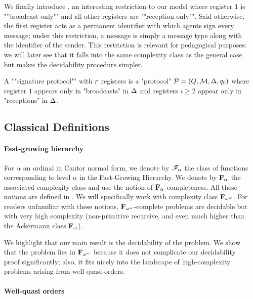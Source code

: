 \AP We finally introduce , an interesting restriction to our model where register $1$ is ""broadcast-only"" and all other registers are ""reception-only"". Said otherwise, the first register acts as a permanent identifier with which agents sign every message; under this restriction, a message is simply a message type along with the identifier of the sender. This restriction is relevant for pedagogical purposes: we will later see that it falls into the same complexity class as the general case but makes the decidability procedure simpler. 

\begin{definition}
A ""signature protocol"" with $r$ registers is a "protocol" $\mathcal{P} = (Q, \mathcal{M}, \Delta, q_0)$ where register $1$ appears only in "broadcasts" in $\Delta$ and registers $i \geq 2$ appear only in "receptions" in $\Delta$. 
\end{definition}

\subsection{Classical Definitions}


\paragraph*{Fast-growing hierarchy}

For $\alpha$ an ordinal in Cantor normal form, we denote by $\mathscr{F}_{\alpha}$ the class of functions corresponding to level $\alpha$ in the Fast-Growing Hierarchy. We denote by $\mathbf{F}_{\alpha}$ the associated complexity class and use the notion of $\mathbf{F}_{\alpha}$-completeness. All these notions are defined in \cite{Schmitz16}. We will specifically work with complexity class $\mathbf{F}_{\omega^{\omega}}$. For readers unfamiliar with these notions, $\mathbf{F}_{\omega^{\omega}}$-complete problems are decidable but with very high complexity (non-primitive recursive, and even much higher than the Ackermann class $\mathbf{F}_{\omega}$). 

We highlight that our main result is the decidability of the problem. We show that the problem lies in $\mathbf{F}_{\omega^{\omega}}$ because it does not complicate our decidability proof significantly; also, it fits nicely into the landscape of high-complexity problems arising from well quasi-orders. 

\paragraph*{Well-quasi orders}


